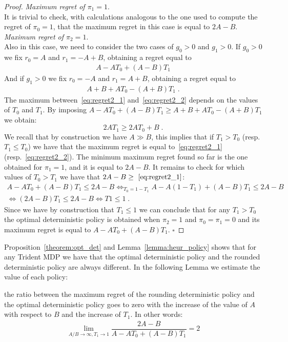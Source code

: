 \begin{proof}
\textit{Maximum regret of $\pi_1=1$}.\\
It is trivial to check, with calculations analogous to the one used to compute the regret of $\pi_0=1$, that the maximum regret in this case is equal to $2A-B$.\\




\textit{Maximum regret of $\pi_2=1$}.\\
Also in this case, we need to consider the two cases of $g_0 > 0$ and $g_1 > 0$. If $g_0 > 0$ we fix $r_0 = A$ and $r_1 = -A+B$, obtaining a regret equal to 
\begin{align}
A- A T_0 +(A-B) T_1 \label{eq:regret2_1}
\end{align}
And if $g_1 > 0$ we fix $r_0 = -A$ and $r_1 = A+B$, obtaining a regret equal to 
\begin{align}
A+B+A T_0 -(A+B) T_1\;. \label{eq:regret2_2}
\end{align}
The maximum between~\eqref{eq:regret2_1} and~\eqref{eq:regret2_2} depends on the values of $T_0$ and $T_1$.
By imposing  $A- A T_0 +(A-B) T_1 \geq A+B+A T_0 -(A+B) T_1$ we obtain:
$$ 2A T_1 \geq 2 A T_0 + B\;. $$
We recall that by construction we have $A \gg B$, this implies that if $T_1> T_0$ (resp. $T_1\leq T_0$)  we have that the maximum regret is equal to~\eqref{eq:regret2_1} (resp.~\eqref{eq:regret2_2}).
The minimum maximum regret found so far is the one obtained for $\pi_1=1$, and it is equal to $2A-B$. It remains to check for which values of $T_0 > T_1$ we have that $2A-B \geq~\eqref{eq:regret2_1}$:
\begin{align*}
A- A T_0 +(A-B) T_1 \leq 2A - B \Leftrightarrow_{T_0 = 1-T_1} A- A (1-T_1) +(A-B) T_1 \leq 2A - B\\
  \Leftrightarrow (2A-B)T_1 \leq 2A-B  \Leftrightarrow T1 \leq 1\;.
\end{align*}
 Since we have by construction that $T_1 \leq1$ we can conclude that for any $T_1> T_0$ the optimal deterministic policy is obtained when $\pi_{2}=1$ and $\pi_{0}=\pi_{1}=0$ and its maximum regret is equal to $A- A T_0 +(A-B) T_1$. $\square$
\end{proof}


Proposition~\ref{theorem:opt_det} and Lemma~\ref{lemma:heur_policy} shows that for any Trident MDP we have that the optimal deterministic policy and the rounded deterministic policy are always different. In the following Lemma we estimate the value of each policy:


\begin{lemma}
the ratio between the maximum regret of the rounding deterministic policy and the optimal deterministic policy goes to zero with the increase of the value of $A$ with respect to $B$ and the increase of $T_1$. In other words:  
\begin{align*}
\lim_{A/B \rightarrow \infty, T_1 \rightarrow 1} \dfrac{2A-B}{A- A T_0 +(A-B) T_1} = 2
\end{align*}
\end{lemma}